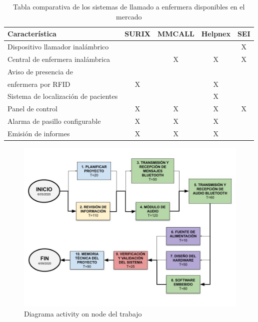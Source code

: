 \begin{table}[h]
	\centering
	\caption[Sistemas de llamado a enfermera]{Tabla comparativa de los sistemas de llamado a enfermera disponibles en el mercado}
	\begin{tabular}{l c c c c}    
		\toprule
		\textbf{Característica} 	 & \textbf{SURIX} & \textbf{MMCALL} & \textbf{Helpnex} & \textbf{SEI}\\
		\midrule
		Dispositivo llamador inalámbrico 				&  	&  	&  	& X \\
		Central de enfermera inalámbrica 				&  	& X & X & X \\
		Aviso de presencia de\\enfermera por RFID 		& X	&  	& X	&   \\
		Sistema de localización de pacientes 			&  	&  	& X	&   \\
		Panel de control 								& X	& X	& X	& X \\
		Alarma de pasillo configurable	 				& X	& X	& X	&   \\
		Emisión de informes				 				& X	& X	& X	&   \\
		\bottomrule
		\hline
	\end{tabular}
	\label{tab:CaracteristicasMDBT42}
\end{table}

\begin{figure}[htpb]
	\centering
	\includegraphics[scale=0.4]{./Figures/ActivityOnNode.jpg}
	\caption{Diagrama activity on node del trabajo}
	\label{fig:mic}
\end{figure}

